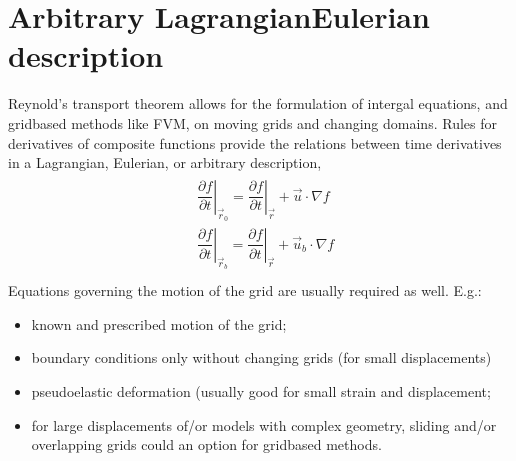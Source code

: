 \documentclass[letterpaper,10pt,english]{jupyterBook}
\begin{document}
\chapter{Arbitrary Lagrangian\sphinxhyphen{}Eulerian description}
\label{\detokenize{ch/pde/ale:arbitrary-lagrangian-eulerian-description}}\label{\detokenize{ch/pde/ale:pde-ale-description}}\label{\detokenize{ch/pde/ale::doc}}
\sphinxAtStartPar
Reynold’s transport theorem allows for the formulation of intergal equations, and grid\sphinxhyphen{}based methods like FVM, on moving grids and changing domains. Rules for derivatives of composite functions provide the relations between time derivatives in a Lagrangian, Eulerian, or arbitrary description,
\begin{equation*}
\begin{split}\begin{aligned}
  & \left.\dfrac{\partial f}{\partial t}\right|_{\vec{r}_0} = \left.\dfrac{\partial f}{\partial t}\right|_{\vec{r}} + \vec{u}   \cdot \nabla f \\
  & \left.\dfrac{\partial f}{\partial t}\right|_{\vec{r}_b} = \left.\dfrac{\partial f}{\partial t}\right|_{\vec{r}} + \vec{u}_b \cdot \nabla f \\
\end{aligned}\end{split}
\end{equation*}
\sphinxAtStartPar
Equations governing the motion of the grid are usually required as well. E.g.:
\begin{itemize}
\item {} 
\sphinxAtStartPar
known and prescribed motion of the grid;

\item {} 
\sphinxAtStartPar
boundary conditions only without changing grids (for small displacements)

\item {} 
\sphinxAtStartPar
pseudo\sphinxhyphen{}elastic deformation (usually good for small strain and displacement;

\item {} 
\sphinxAtStartPar
for large displacements of/or models with complex geometry, sliding and/or overlapping grids could an option for grid\sphinxhyphen{}based methods.

\end{itemize}
\end{document}
